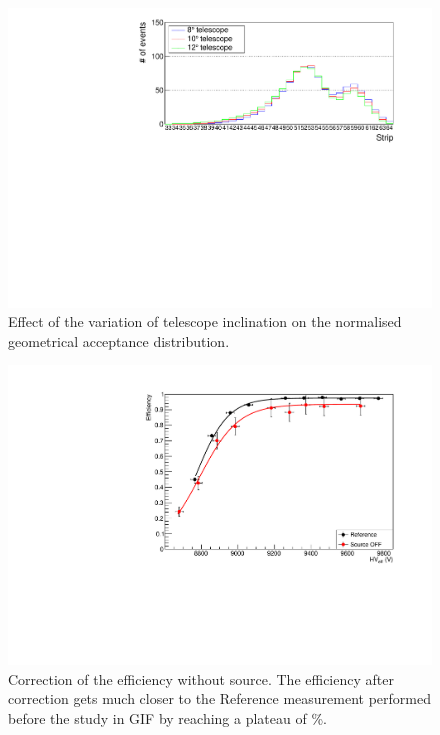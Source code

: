 	\begin{figure}[H]
		\centering
		\includegraphics[width = .7\linewidth]{fig/chapt5/Acc-Angle.pdf}
		\caption{\label{fig:Acc-Angle} Effect of the variation of telescope inclination on the normalised geometrical acceptance distribution.}
	\end{figure}

	\begin{figure}[H]
		\centering
		\includegraphics[width = .7\linewidth]{fig/chapt5/Compared-Efficiency-Correction.pdf}
		\caption{\label{fig:EffCorrection} Correction of the efficiency without source. The efficiency after correction gets much closer to the Reference measurement performed before the study in GIF by reaching a plateau of \%.}
	\end{figure}
	
\begingroup\setlength{\intextsep}{0pt}\setlength{\columnsep}{15pt}
	

